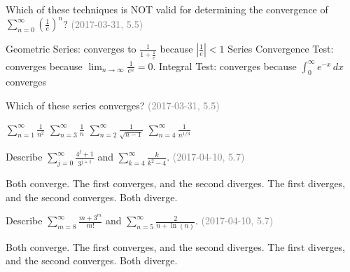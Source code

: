 \documentclass[12pt]{exam}
\newcommand{\questionDate}[1]{\textcolor{gray}{(#1)}}
\newcommand{\<}{\langle}
\renewcommand{\>}{\rangle}
\begin{document}
\begin{questions}
\newpage

\question
Which of these techniques is NOT valid for determining the convergence
of \(\displaystyle\sum_{n=0}^\infty \left(\frac{1}{e}\right)^n\)?
\questionDate{2017-03-31, 5.5}
\begin{choices}
\choice
  Geometric Series: converges to \(\frac{1}{1+\frac{1}{e}}\)
  because \(|\frac{1}{e}|<1\)
\CorrectChoice
  Series Convergence Test: converges because
  \(\displaystyle\lim_{n\to\infty}\frac{1}{e^n}=0\).
\choice
  Integral Test: converges because \(\int_0^\infty e^{-x}\,dx\) converges
\end{choices}

\question
Which of these series converges?
\questionDate{2017-03-31, 5.5}
\begin{choices}
\CorrectChoice
  \(\displaystyle\sum_{n=1}^\infty\frac{1}{n^2}\)
\choice
  \(\displaystyle\sum_{n=3}^\infty\frac{1}{n}\)
\choice
  \(\displaystyle\sum_{n=2}^\infty\frac{1}{\sqrt{n-1}}\)
\choice
  \(\displaystyle\sum_{n=4}^\infty\frac{1}{n^{1/3}}\)
\end{choices}


\newpage

\question
Describe \(\displaystyle\sum_{j=0}^\infty\frac{4^j+1}{3^{j+1}}\) and
\(\displaystyle\sum_{k=4}^\infty\frac{k}{k^2-4}\).
\questionDate{2017-04-10, 5.7}
\begin{choices}
\choice
  Both converge.
\choice
  The first converges, and the second diverges.
\choice
  The first diverges, and the second converges.
\CorrectChoice
  Both diverge.
\end{choices}

\question
Describe \(\displaystyle\sum_{m=8}^\infty\frac{m+3^m}{m!}\) and
\(\displaystyle\sum_{n=5}^\infty\frac{2}{n+\ln(n)}\).
\questionDate{2017-04-10, 5.7}
\begin{choices}
\choice
  Both converge.
\CorrectChoice
  The first converges, and the second diverges.
\choice
  The first diverges, and the second converges.
\choice
  Both diverge.
\end{choices}


\end{questions}
\end{document}
